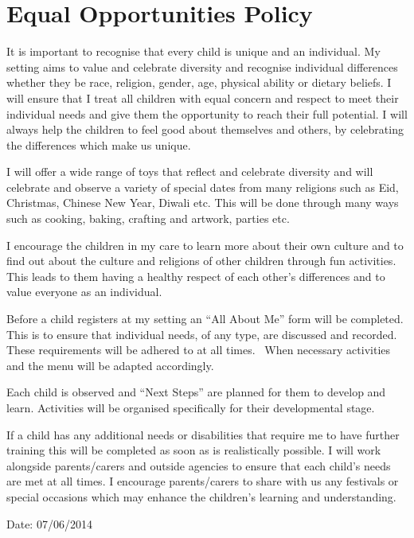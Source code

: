 \documentclass[10pt]{article}
\begin{document}
\section{Equal Opportunities Policy}

It is important to recognise that every child is unique and an
individual. My setting aims to value and celebrate diversity and
recognise individual differences whether they be race, religion, gender,
age, physical ability or dietary beliefs. I will ensure that I treat all
children with equal concern and respect to meet their individual needs
and give them the opportunity to reach their full potential. I will
always help the children to feel good about themselves and others, by
celebrating the differences which make us unique.

I will offer a wide range of toys that reflect and celebrate diversity
and will celebrate and observe a variety of special dates from many
religions such as Eid, Christmas, Chinese New Year, Diwali etc. This
will be done through many ways such as cooking, baking, crafting and
artwork, parties etc.

I encourage the children in my care to learn more about their own
culture and to find out about the culture and religions of other
children through fun activities. This leads to them having a healthy
respect of each other's differences and to value everyone as an
individual.

Before a child registers at my setting an ``All About Me'' form will be
completed. This is to ensure that individual needs, of any type, are
discussed and recorded. These requirements will be adhered to at all
times. ~When necessary activities and the menu will be adapted
accordingly.

Each child is observed and ``Next Steps'' are planned for them to
develop and learn. Activities will be organised specifically for their
developmental stage.

If a child has any additional needs or disabilities that require me to
have further training this will be completed as soon as is realistically
possible. I will work alongside parents/carers and outside agencies to
ensure that each child's needs are met at all times. I encourage
parents/carers to share with us any festivals or special occasions which
may enhance the children's learning and understanding.

Date: 07/06/2014

~
\end{document}
